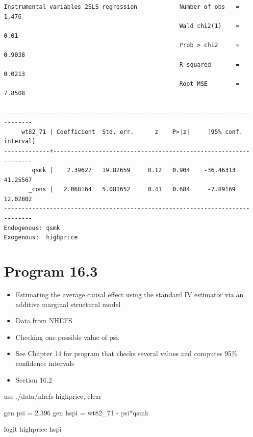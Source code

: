 \documentclass[
  10pt,
  a4paper,
]{book}
\newenvironment{Shaded}{\begin{snugshade}}{\end{snugshade}}
\newcommand{\KeywordTok}[1]{\textcolor[rgb]{0.00,0.46,0.62}{#1}}
\newcommand{\NormalTok}[1]{\textcolor[rgb]{0.00,0.46,0.62}{#1}}
\providecommand{\tightlist}{%
  \setlength{\itemsep}{0pt}\setlength{\parskip}{0pt}}
\begin{document}
\begin{verbatim}
Instrumental variables 2SLS regression            Number of obs   =      1,476
                                                  Wald chi2(1)    =       0.01
                                                  Prob > chi2     =     0.9038
                                                  R-squared       =     0.0213
                                                  Root MSE        =     7.8508

------------------------------------------------------------------------------
     wt82_71 | Coefficient  Std. err.      z    P>|z|     [95% conf. interval]
-------------+----------------------------------------------------------------
        qsmk |    2.39627   19.82659     0.12   0.904    -36.46313    41.25567
       _cons |   2.068164   5.081652     0.41   0.684     -7.89169    12.02802
------------------------------------------------------------------------------
Endogenous: qsmk
Exogenous:  highprice
\end{verbatim}

\section{Program 16.3}\label{program-16.3-1}

\begin{itemize}
\tightlist
\item
  Estimating the average causal effect using the standard IV estimator via an additive marginal structural model
\item
  Data from NHEFS
\item
  Checking one possible value of psi.
\item
  See Chapter 14 for program that checks several values and computes 95\% confidence intervals\\
\item
  Section 16.2
\end{itemize}

\begin{Shaded}
\begin{Highlighting}[]
\KeywordTok{use}\NormalTok{ ./}\KeywordTok{data}\NormalTok{/nhefs{-}highprice, }\KeywordTok{clear}

\KeywordTok{gen}\NormalTok{ psi = 2.396}
\KeywordTok{gen}\NormalTok{ hspi = wt82\_71 {-} psi*qsmk}

\KeywordTok{logit}\NormalTok{ highprice hspi}
\end{Highlighting}
\end{Shaded}
\end{document}
